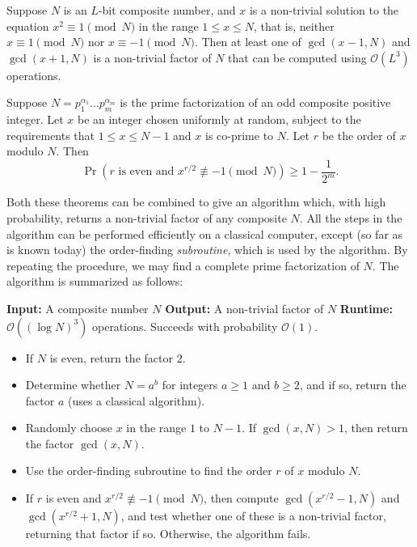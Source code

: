 \begin{theorem}
    Suppose $N$ is an $L$-bit composite number, and $x$ is a non-trivial solution to the equation $x^2 \equiv 1 \pmod{N}$ in the range $1 \leq x \leq N$, that is, neither $x \equiv 1 \pmod{N}$ nor $x \equiv -1 \pmod{N}$. Then at least one of $\gcd(x - 1, N)$ and $\gcd(x + 1, N)$ is a non-trivial factor of $N$ that can be computed using $\mathcal{O}(L^3)$ operations.
\end{theorem}

\begin{theorem}
    Suppose $N = p_1^{\alpha_1} \ldots p_m^{\alpha_m}$ is the prime factorization of an odd composite positive integer. Let $x$ be an integer chosen uniformly at random, subject to the requirements that $1 \leq x \leq N - 1$ and $x$ is co-prime to $N$. Let $r$ be the order of $x$ modulo $N$. Then
    \[
    \Pr\left(r \text{ is even and } x^{r/2} \not\equiv -1 \pmod{N} \right) \geq 1 - \frac{1}{2^m}.
    \]
\end{theorem}

Both these theorems can be combined to give an algorithm which, with high probability, returns a non-trivial factor of any composite $N$. All the steps in the algorithm can be performed efficiently on a classical computer, except (so far as is known today) the order-finding \emph{subroutine}, which is used by the algorithm. By repeating the procedure, we may find a complete prime factorization of $N$. The algorithm is summarized as follows:

\begin{algorithm}
    \caption{Shor's Algorithm}
    \begin{algorithmic}[1]
    \State \textbf{Input:} A composite number $N$
    \State \textbf{Output:} A non-trivial factor of $N$
    \State \textbf{Runtime: } $\mathcal{O}((\log N)^3)$ operations. Succeeds with probability $\mathcal{O}(1)$.
    \State \begin{itemize}
        \item If $N$ is even, return the factor $2$.
        \item Determine whether $N = a^b$ for integers $a \geq 1$ and $b \geq 2$, and if so, return the factor $a$ (uses a classical algorithm).
        \item Randomly choose $x$ in the range $1$ to $N - 1$. If $\gcd(x, N) > 1$, then return the factor $\gcd(x, N)$.
        \item Use the order-finding subroutine to find the order $r$ of $x$ modulo $N$.
        \item If $r$ is even and $x^{r/2} \not\equiv -1 \pmod{N}$, then compute $\gcd(x^{r/2} - 1, N)$ and $\gcd(x^{r/2} + 1, N)$, and test whether one of these is a non-trivial factor, returning that factor if so. Otherwise, the algorithm fails.
    \end{itemize}
    \end{algorithmic}
\end{algorithm}


